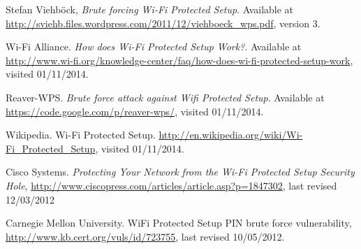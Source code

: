 \documentclass[a4paper,11pt]{article}
\begin{document}
\begin{thebibliography}{N}
 Stefan Viehb\"{o}ck, \textit{Brute forcing Wi-Fi Protected Setup}. Available at \url{http://sviehb.files.wordpress.com/2011/12/viehboeck_wps.pdf}, version 3.

 Wi-Fi Alliance. \textit{How does Wi-Fi Protected Setup Work?}. Available at \url{http://www.wi-fi.org/knowledge-center/faq/how-does-wi-fi-protected-setup-work}, visited 01/11/2014.

 Reaver-WPS. \textit{Brute force attack against Wifi Protected Setup}. Available at \url{https://code.google.com/p/reaver-wps/}, visited 01/11/2014.

 Wikipedia. Wi-Fi Protected Setup. \url{http://en.wikipedia.org/wiki/Wi-Fi_Protected_Setup}, visited 01/11/2014.

 Cisco Systems. \textit{Protecting Your Network from the Wi-Fi Protected Setup Security Hole}, \url{http://www.ciscopress.com/articles/article.asp?p=1847302}, last revised 12/03/2012

 Carnegie Mellon University. WiFi Protected Setup PIN brute force vulnerability, \url{http://www.kb.cert.org/vuls/id/723755}, last revised 10/05/2012.

\end{thebibliography}
\end{document}
